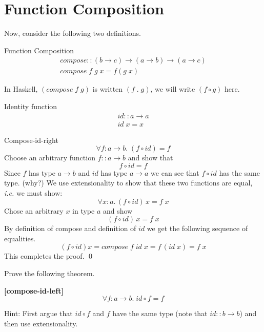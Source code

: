 \documentclass[11pt]{article}
\begin{document}
\section{Function Composition}


\goodbreak\noindent{}Now, consider the following two definitions.
\vspace{.06125in}

\begin{definition}{Function Composition}
\[\begin{array}{l}
compose :: (b\rightarrow{}c)\rightarrow (a\rightarrow{}b) \rightarrow (a \rightarrow c)\\
compose\; f\; g \; x = f (g\; x)
\end{array}
\]
\end{definition}

In Haskell, $(compose\; f\; g)$ is written $(f\;.\;g)$, we will write
$(f\circ{}g)$ here.

\begin{definition}{Identity function}
\[\begin{array}{l}
id :: a \rightarrow {}a\\
id\; x = x
\end{array}
\]
\end{definition}

\begin{theorem}{Compose-id-right}
\[\forall{}f:a\rightarrow{}b.\; (f\circ{} id) = f\]
\Proof
Choose an arbitrary function $f::a\rightarrow{}b$ and show that 
\[ f\circ{}id = f\]
Since $f$ has type $a\rightarrow{}b$ and $id$ has type $a\rightarrow{}a$ we can
see that $f\circ{}id$ has the same type. (why?)  We use extensionality to show
that these two functions are equal, {\em{i.e.}} we must show:
\[\forall{}x:a.\, (f\circ{}id)\,x =f\; x\]
Chose an arbitrary $x$ in type $a$ and show
\[(f\circ{}id)\,x =f\; x\]
By definition of compose and definition of $id$ we get the following sequence of equalities.
\[(f\circ{}id)x = compose\;f\;id\;x = f\,(id\;x) = f \; x\]
This completes the proof.
\qed

\end{theorem}


\begin{problem}
Prove the following theorem. 
\begin{theorem}{\bf{[compose-id-left]}} 
\[\forall{}f:a \rightarrow b.\;id\circ{} f = f\]
\end{theorem}

Hint: First argue that $id\circ{}f$ and $f$ have the same type (note that
$id::b\rightarrow{}b$) and then use extensionality.


\end{problem}
\end{document}
